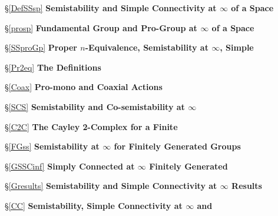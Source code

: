 \documentclass[12pt]{article}
\begin{document}
\noindent\hspace{.6in} \S \ref{DefSSsp} {\bf Semistability and Simple Connectivity at $\infty$ of a Space}

\noindent\hspace{.6in} \S \ref{prosp} {\bf Fundamental Group and Pro-Group at $\infty$ of a Space}

\noindent \hspace{.95in}{\bf and the Equivalence of Several Definitions} 

\noindent\hspace{.6in} \S \ref{SSproGp} {\bf Proper $n$-Equivalence, Semistability at $\infty$, Simple} 
 
\noindent \hspace{.95in}{\bf Connectivity at $\infty$, Fundamental Pro-Group at $\infty$} 

\noindent \hspace{.95in}{\bf and Fundamental Group at $\infty$ - for a Group}

\noindent\hspace{1.2in} \S \ref{Pr2eq} {\bf The Definitions} 

\noindent\hspace{1.2in} \S \ref{Coax} {\bf Pro-mono and Coaxial Actions}

\noindent\hspace{1.2in} \S \ref{SCS} {\bf Semistability and Co-semistability at $\infty$}

\noindent\hspace{1.2in} \S \ref{C2C} {\bf The Cayley 2-Complex for a Finite} 

\noindent \hspace{1.7in}{\bf Presentation of a Group}

\noindent\hspace{1.2in} \S \ref{FGss} {\bf Semistability at $\infty$ for Finitely Generated Groups}

\noindent\hspace{1.2in} \S \ref{GSSCinf} {\bf Simply Connected at $\infty$ Finitely Generated} 

\noindent \hspace{1.7in}{\bf Groups}

\noindent\hspace{.6in} \S \ref{Gresults} {\bf Semistability and Simple Connectivity at $\infty$ Results} 

\noindent\hspace {.95in}{\bf for Classes of Groups}

\noindent\hspace{1.2in} \S \ref{CC} {\bf Semistability, Simple Connectivity at $\infty$ and} 
\end{document}
